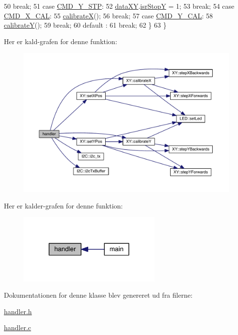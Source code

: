 \begin{DoxyCode}
50       \textcolor{keywordflow}{break};
51     \textcolor{keywordflow}{case} \hyperlink{handler_8h_a83ab3037b2c91ea010b2d8c47acd5434}{CMD\_Y\_STP}:
52       \hyperlink{data_8h_a89d7998a721b3f36f9f4131e7a5e42d2}{dataXY}.\hyperlink{data_8h_a92ec85e6a09f5dc7ed83640f1810c4bb}{isrStopY} = 1;
53       \textcolor{keywordflow}{break};
54     \textcolor{keywordflow}{case} \hyperlink{handler_8h_a5edf35288955238e1090f2367f96e828}{CMD\_X\_CAL}:
55       \hyperlink{xy_8h_a7930e37ef31e3575388f1bce7870872c}{calibrateX}();
56       \textcolor{keywordflow}{break};
57     \textcolor{keywordflow}{case} \hyperlink{handler_8h_a2b2db51eef91dc2aa5586d0817838ef2}{CMD\_Y\_CAL}:
58       \hyperlink{xy_8h_ab52d33c452fb38ec0fb6c9ad77031ccd}{calibrateY}();
59       \textcolor{keywordflow}{break};
60     \textcolor{keywordflow}{default} :
61       \textcolor{keywordflow}{break};
62   \}
63 \}
\end{DoxyCode}


Her er kald-\/grafen for denne funktion\+:\nopagebreak
\begin{figure}[H]
\begin{center}
\leavevmode
\includegraphics[width=350pt]{d2/d01/class_handler_af5be5b016b862943cd22504490acc8f4_cgraph}
\end{center}
\end{figure}




Her er kalder-\/grafen for denne funktion\+:\nopagebreak
\begin{figure}[H]
\begin{center}
\leavevmode
\includegraphics[width=203pt]{d2/d01/class_handler_af5be5b016b862943cd22504490acc8f4_icgraph}
\end{center}
\end{figure}




Dokumentationen for denne klasse blev genereret ud fra filerne\+:\begin{DoxyCompactItemize}
\item 
\hyperlink{handler_8h}{handler.\+h}\item 
\hyperlink{handler_8c}{handler.\+c}\end{DoxyCompactItemize}

